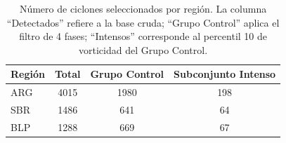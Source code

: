 \begin{table}[ht]
\centering
\caption{Número de ciclones seleccionados por región. La columna ``Detectados'' refiere a la base cruda; ``Grupo Control'' aplica el filtro de 4 fases; ``Intensos'' corresponde al percentil 10 de vorticidad del Grupo Control.}
\label{tab:conteo_ciclones}
\begin{tabular}{l c c c}
\hline
\textbf{Región} & \textbf{Total} & \textbf{Grupo Control} & \textbf{Subconjunto Intenso} \\ \hline
ARG      & 4015 & 1980 & 198 \\
SBR    & 1486 & 641  & 64  \\
BLP & 1288 & 669  & 67  \\ \hline
\end{tabular}
\end{table}